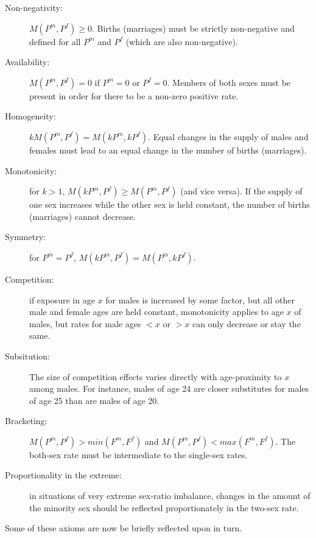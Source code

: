 \begin{description}
  \item[Non-negativity: ] $M(P^m, P^f) \ge 0$. Births (marriages) must be
  strictly non-negative and defined for all $P^m$ and $P^f$ (which are also
  non-negative).
  \item[Availability:] $M(P^m, P^f) = 0$ if $P^m = 0$ or $P^f = 0$. Members of
  both sexes must be present in order for there to be a non-zero positive rate.
  \item[Homogeneity:] $kM(P^m, P^f) = M(kP^m, kP^f)$. Equal
  changes in the supply of males and females must lead to an equal change in the
  number of births (marriages).
  \item[Monotonicity:] for $k > 1$, $M(kP^m, P^f) \ge M(P^m, P^f)$ (and vice
  versa). If the supply of one sex increases while the other sex is held constant, the number of
  births (marriages) cannot decrease.
  \item[Symmetry:] for $P^m = P^f$, $M(kP^m, P^f) = M(P^m, kP^f)$. 
  \item[Competition:] if exposure in age $x$ for males is increased by some
  factor, but all other male and female ages are held constant, monotonicity
  applies to age $x$ of males, but rates for male ages $<x$ or $>x$ can only
  decrease or stay the same. 
  \item[Subsitution:] The size of competition effects varies directly with
  age-proximity to $x$ among males. For instance, males of age 24 are closer
  substitutes for males of age 25 than are males of age 20.
  \item[Bracketing:] $M(P^m, P^f) > min(F^m, F^f)$ and $M(P^m, P^f) < max(F^m,
  F^f)$. The both-sex rate must be intermediate to the single-sex rates.
  \item[Proportionality in the extreme:] in situations of very extreme sex-ratio
  imbalance, changes in the amount of the minority sex should be reflected proportionately
  in the two-sex rate.
\end{description}
 
Some of these axioms are now be briefly reflected upon in turn.

